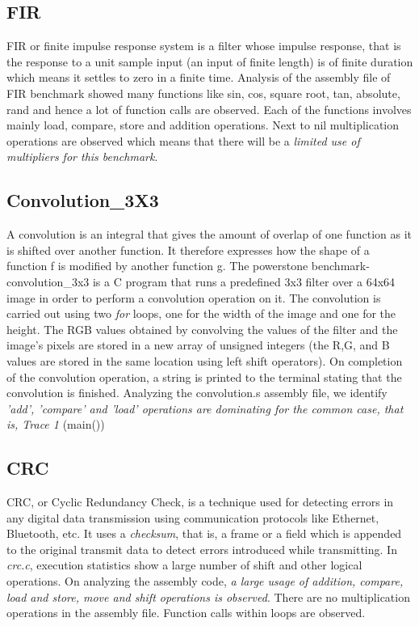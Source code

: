 \documentclass[conference]{IEEEtran}
\begin{document}
\subsection{FIR}
FIR or finite impulse response system is a filter whose impulse response, that is the response to a unit sample input (an input of finite length) is of finite duration which means it settles to zero in a finite time. Analysis of the assembly file of FIR benchmark showed many functions like sin, cos, square root, tan, absolute, rand and hence a lot of function calls are observed. Each of the functions involves mainly load, compare, store and addition operations. Next to nil multiplication operations are observed which means that there will be a \textit{limited use of multipliers
for this benchmark}.

\subsection{Convolution\_3X3}
A convolution is an integral that gives the amount of overlap of one function as it is shifted over another function. It therefore expresses how the shape of a function f is modified by another function g. The powerstone benchmark-convolution\_3x3 is a C program that runs a predefined 3x3 filter over a 64x64 image in order to perform a convolution operation on it. The convolution is carried out using two \textit{for} loops, one for the width of the image and one for the height. The RGB values obtained by convolving the values of the filter and the image's pixels are stored in a new array of unsigned integers (the R,G, and B values are stored in the same location using left shift operators). On completion of the convolution operation, a string is printed to the terminal stating that the convolution is finished. Analyzing the convolution.s assembly file, we identify \textit{'add', 'compare' and 'load' operations are  dominating for the common case, that is, Trace 1} (main()) 

\subsection{CRC}
CRC, or Cyclic Redundancy Check, is a technique
used for detecting errors in any digital data transmission
using communication protocols like Ethernet, Bluetooth, etc. It
uses a \textit{checksum}, that is, a frame or a field
which is appended to the original transmit data to detect errors introduced while transmitting.
In \textit{crc.c}, execution statistics show a large number of shift and other logical operations. On analyzing the assembly code, \textit{a large usage of addition, compare, load and store, move and shift operations is observed}. There are no multiplication operations in the assembly file. Function calls within loops are observed.
\end{document}
